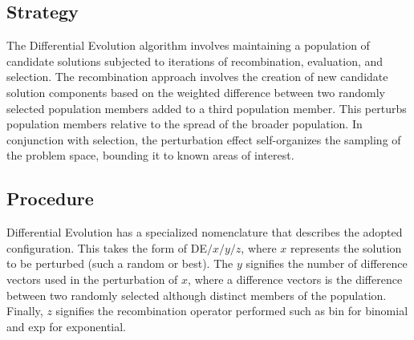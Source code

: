 \subsection{Strategy}
The Differential Evolution algorithm involves maintaining a population of candidate solutions subjected to iterations of recombination, evaluation, and selection. The recombination approach involves the creation of new candidate solution components based on the weighted difference between two randomly selected population members added to a third population member. This perturbs population members relative to the spread of the broader population. In conjunction with selection, the perturbation effect self-organizes the sampling of the problem space, bounding it to known areas of interest.

\subsection{Procedure}
Differential Evolution has a specialized nomenclature that describes the adopted configuration. This takes the form of DE$/x/y/z$, where $x$ represents the solution to be perturbed (such a random or best). The $y$ signifies the number of difference vectors used in the perturbation of $x$, where a difference vectors is the difference between two randomly selected although distinct members of the population. Finally, $z$ signifies the recombination operator performed such as bin for binomial and exp for exponential. 

